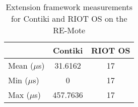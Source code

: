 \begin{table}[!ht]
  \centering
  \begin{tabular}{l|c|c}
                & Contiki  & RIOT OS \\ \hline
  Mean ($\mu$s) & 31.6162  & 17      \\
  Min  ($\mu$s) & 0        & 17      \\
  Max  ($\mu$s) & 457.7636 & 17     
  \end{tabular}
  \caption{Extension framework measurements for Contiki and RIOT OS on the RE-Mote}
  \label{tab:extension-framework-remote}
  \end{table}
